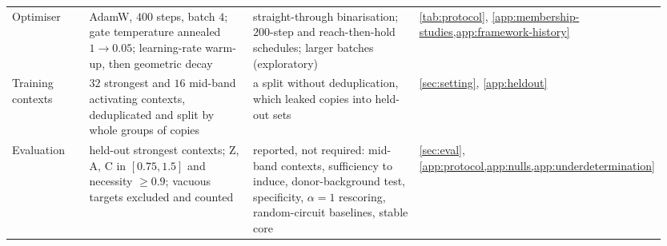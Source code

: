 {\begin{longtable}{@{}p{0.13\linewidth}p{0.33\linewidth}p{0.33\linewidth}p{0.16\linewidth}@{}}
Optimiser & AdamW, $400$ steps, batch $4$; gate temperature annealed $1 \to 0.05$; learning-rate warm-up, then geometric decay & straight-through binarisation; $200$-step and reach-then-hold schedules; larger batches (exploratory) & \cref{tab:protocol}, \cref{app:membership-studies,app:framework-history} \\
Training contexts & $32$ strongest and $16$ mid-band activating contexts, deduplicated and split by whole groups of copies & a split without deduplication, which leaked copies into held-out sets & \cref{sec:setting}, \cref{app:heldout} \\
Evaluation & held-out strongest contexts; Z, A, C in $[0.75, 1.5]$ and necessity $\geq 0.9$; vacuous targets excluded and counted & reported, not required: mid-band contexts, sufficiency to induce, donor-background test, specificity, $\alpha = 1$ rescoring, random-circuit baselines, stable core & \cref{sec:eval}, \cref{app:protocol,app:nulls,app:underdetermination} \\
\end{longtable}}

